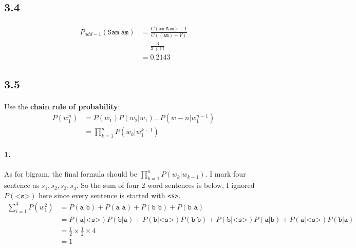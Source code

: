 \documentclass{article}
\begin{document}
\subsection*{3.4}
\paragraph{}
\begin{align*}
    P_{add-1}(\texttt{Sam|am}) & = \frac{C(\texttt{am Sam}) + 1}{C((\texttt{am}) + V)} \\
                               & = \frac{3}{3 + 11}                                    \\
                               & = 0.2143
\end{align*}

\subsection*{3.5}
\paragraph{}
Use the \textbf{chain rule of probability}:
\begin{align*}
    P(w_1^n) & = P(w_1)P(w_2|w_1) \dots P(w-n|w_1^{n-1}) \\
             & = \prod_{k=1}^{n} P(w_k|w_1^{k-1})
\end{align*}

\paragraph{1.}
As for bigram, the final formula should be $\prod_{k=1}^{n} P(w_k|w_{k-1})$.
I mark four sentence as $s_1, s_2, s_3, s_4$.
So the sum of four 2 word sentences is below, I ignored $P(\texttt{<s>})$
here since every sentence is started with \texttt{<s>}.
\begin{align*}
    \sum_{i=1}^{4}P(w_1^2) & = P(\texttt{a b}) + P(\texttt{a a}) + P(\texttt{b b}) + P(\texttt{b a}) \\
                           & = P(\texttt{a|<s>})P(\texttt{b|a}) + P(\texttt{b|<s>})P(\texttt{b|b})
    + P(\texttt{b|<s>})P(\texttt{a|b}) + P(\texttt{a|<s>})P(\texttt{b|a})                            \\
                           & = \frac{1}{2} \times \frac{1}{2} \times 4                               \\
                           & = 1
\end{align*}
\end{document}

